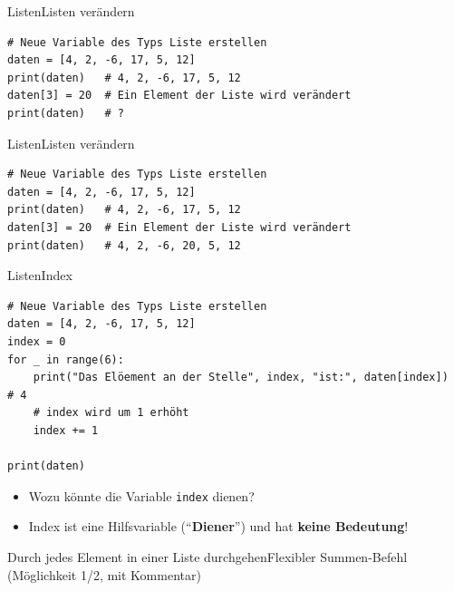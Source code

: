 \begin{frame}[fragile]{Listen}{Listen verändern}
	\begin{lstlisting}
# Neue Variable des Typs Liste erstellen
daten = [4, 2, -6, 17, 5, 12] 
print(daten)   # 4, 2, -6, 17, 5, 12
daten[3] = 20  # Ein Element der Liste wird verändert
print(daten)   # ?
\end{lstlisting}
\end{frame}

\begin{frame}[fragile]{Listen}{Listen verändern}
	\begin{lstlisting}
# Neue Variable des Typs Liste erstellen
daten = [4, 2, -6, 17, 5, 12] 
print(daten)   # 4, 2, -6, 17, 5, 12
daten[3] = 20  # Ein Element der Liste wird verändert
print(daten)   # 4, 2, -6, 20, 5, 12
\end{lstlisting}
\end{frame}


\begin{frame}[fragile]{Listen}{Index}
	\begin{lstlisting}
# Neue Variable des Typs Liste erstellen
daten = [4, 2, -6, 17, 5, 12] 
index = 0
for _ in range(6):
	print("Das Elöement an der Stelle", index, "ist:", daten[index])   # 4
	# index wird um 1 erhöht
	index += 1

print(daten)
\end{lstlisting}


	\begin{itemize}[<+->]
		\item Wozu könnte die Variable \lstinline|index| dienen?
		\item Index ist eine Hilfsvariable (\enquote{\textbf{Diener}}) und hat \textbf{keine Bedeutung}!
	\end{itemize}
\end{frame}


\begin{frame}[fragile]{Durch jedes Element in einer Liste durchgehen}{Flexibler Summen-Befehl (Möglichkeit 1/2, mit Kommentar)}
	
\end{frame}


